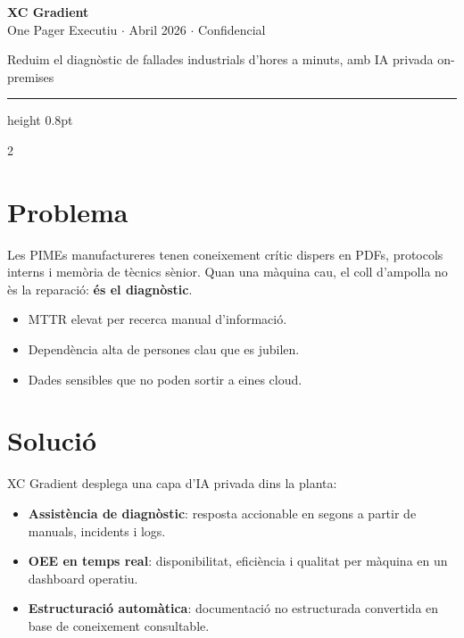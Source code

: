 \documentclass[10pt,a4paper]{article}
\begin{document}
\begin{center}
{\LARGE\bfseries\color{dark} XC Gradient}\\[0.1em]
{\small\color{midgray} One Pager Executiu $\cdot$ Abril 2026 $\cdot$ Confidencial}\\[0.35em]
\colorbox{accent}{\color{white}\small\bfseries\strut\quad Reduim el diagn\`ostic de fallades industrials d'hores a minuts, amb IA privada on-premises \quad}
\end{center}

\vspace{0.25em}
{\color{accent}\hrule height 0.8pt}
\vspace{0.35em}

\begin{multicols}{2}

\section{Problema}
Les PIMEs manufactureres tenen coneixement cr\'itic dispers en PDFs, protocols interns i mem\`oria de t\`ecnics s\`enior. Quan una m\`aquina cau, el coll d'ampolla no \`es la reparaci\'o: \textbf{\'es el diagn\`ostic}.

\begin{itemize}[leftmargin=1em,itemsep=1pt,topsep=2pt]
\item MTTR elevat per recerca manual d'informaci\'o.
\item Depend\`encia alta de persones clau que es jubilen.
\item Dades sensibles que no poden sortir a eines cloud.
\end{itemize}

\section{Soluci\'o}
XC Gradient desplega una capa d'IA privada dins la planta:
\begin{itemize}[leftmargin=1em,itemsep=1pt,topsep=2pt]
\item \textbf{Assist\`encia de diagn\`ostic}: resposta accionable en segons a partir de manuals, incidents i logs.
\item \textbf{OEE en temps real}: disponibilitat, efici\`encia i qualitat per m\`aquina en un dashboard operatiu.
\item \textbf{Estructuraci\'o autom\`atica}: documentaci\'o no estructurada convertida en base de coneixement consultable.
\end{itemize}


\end{multicols}
\end{document}
